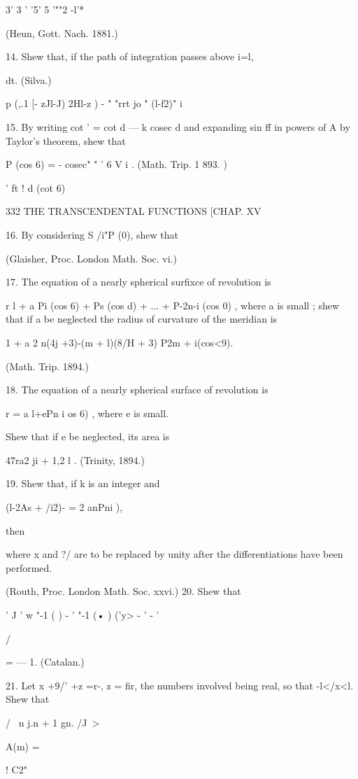 {{{{3' 3 ' '5' 5 '""2 -l'*

(Heun, Gott. Nach. 1881.)

14. Shew that, if the path of integration passes above i=l,

dt. (Silva.)

p (,.1 [- zJl-J) 2Hl-z ) - " "rrt jo " (l-f2)" i

15. By writing cot ' = cot d — k cosec d and expanding sin ff in
powers of A by Taylor's theorem, shew that

P (cos 6) = - cosec" " ' 6 V i . (Math. Trip. 1 893. )

' ft ! d (cot 6)

332 THE TRANSCENDENTAL FUNCTIONS [CHAP. XV

16. By considering S /i"P (0), shew that

(Glaisher, Proc. London Math. Soc. vi.)

17. The equation of a nearly spherical surfixce of revolution is

r l + a Pi (cos 6) + Ps (cos d) + ... + P-2n-i (cos 0) , where a is
small ; shew that if a be neglected the radius of curvature of the
meridian is

1 + a 2 n(4j +3)-(m + l)(8/H + 3) P2m + i(cos<9).

(Math. Trip. 1894.)

18. The equation of a nearly spherical surface of revolution is

r = a l+ePn i os 6) , where e is small.

Shew that if e be neglected, its area is

47ra2 ji + 1,2 l . (Trinity, 1894.)

19. Shew that, if k is an integer and

(l-2As + /i2)- = 2 anPni ),

then

where x and ?/ are to be replaced by unity after the differentiations
have been performed.

(Routh, Proc. London Math. Soc. xxvi.) 20. Shew that

' J ' w "-1 ( ) - ' "-1 (• ) ('y> - ' - '

/

= — 1. (Catalan.)

21. Let x +9/' +z =r-, z = fir, the numbers involved being real, so
that -l</x<l. Shew that

/ \ n j.n + 1 gn. /J~>

A(m) =

  ! C2"

}}}}
